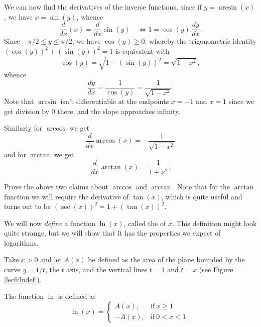 \noindent
We can now find the derivatives of the inverse functions, since if $y = \arcsin(x)$, we have $x = \sin(y)$, whence
\[
	\frac{d}{d x} (x) = \frac{d}{d x} \sin(y) \quad \Longleftrightarrow 1 = \cos(y) \, \frac{d y}{d x}.
\]
Since $-\pi / 2 \leq y \leq \pi / 2$, we have $\cos(y) \geq 0$, whereby the trigonometric identity $(\cos(y))^2 + (\sin(y))^2 = 1$ is equivalent with
\[
	\cos(y) = \sqrt{1 - (\sin(y))^2} = \sqrt{1 - x^2},
\]
whence
\[
	\frac{d y}{d x} = \frac{1}{\cos(y)} = \frac{1}{\sqrt{1 - x^2}}.
\]
Note that $\arcsin$ isn't differentiable at the endpoints $x = -1$ and $x = 1$ since we get division by $0$ there, and the slope approaches infinity.

Similarly for $\arccos$ we get
\[
	\frac{d}{d x} \arccos(x) = - \frac{1}{\sqrt{1 - x^2}}
\]
and for $\arctan$ we get
\[
	\frac{d}{d x} \arctan(x) = \frac{1}{1 + x^2}.
\]

\begin{exercise}
	Prove the above two claims about $\arccos$ and $\arctan$. Note that for the $\arctan$ function we will require the derivative of $\tan(x)$, which is quite useful and turns out to be $(\sec(x))^2 = 1 + (\tan(x))^2$.
\end{exercise}



We will now \emph{define} a function $\ln(x)$, called the  of $x$. This definition might look quite strange, but we will show that it has the properties we expect of logarithms.

\begin{definition}
	Take $x > 0$ and let $A(x)$ be defined as the area of the plane bounded by the curve $y = 1/t$, the $t$ axis, and the vertical lines $t = 1$ and $t = x$ (see Figure \ref{lec6:lndef}).

	The function $\ln$ is defined as
	\[
		\ln(x) = \begin{cases}
		A(x), & \text{if}~ x \geq 1 \\
		- A(x), & \text{if}~ 0 < x < 1.
		\end{cases}
	\]
\end{definition}


